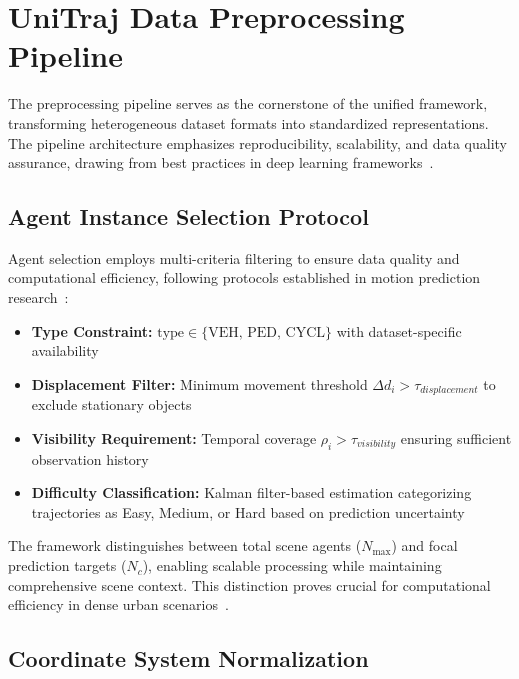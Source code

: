 \section{UniTraj Data Preprocessing Pipeline}
\label{sec:data_pipeline}

The preprocessing pipeline serves as the cornerstone of the unified framework, transforming heterogeneous dataset formats into standardized representations. The pipeline architecture emphasizes reproducibility, scalability, and data quality assurance, drawing from best practices in deep learning frameworks~\cite{vaswani2023attention}.

\subsection{Agent Instance Selection Protocol}
\label{ssec:agent_selection}

Agent selection employs multi-criteria filtering to ensure data quality and computational efficiency, following protocols established in motion prediction research~\cite{WOMD2021, Chai2019MultiPath}:

\begin{itemize}
    \item \textbf{Type Constraint:} $\text{type} \in \{\text{VEH, PED, CYCL}\}$ with dataset-specific availability
    \item \textbf{Displacement Filter:} Minimum movement threshold $\Delta d_{i} > \tau_{displacement}$ to exclude stationary objects
    \item \textbf{Visibility Requirement:} Temporal coverage $\rho_{i} > \tau_{visibility}$ ensuring sufficient observation history
    \item \textbf{Difficulty Classification:} Kalman filter-based estimation categorizing trajectories as Easy, Medium, or Hard based on prediction uncertainty~\cite{MultiPathPlusPlus2022}
\end{itemize}

The framework distinguishes between total scene agents ($N_{\max}$) and focal prediction targets ($N_{c}$), enabling scalable processing while maintaining comprehensive scene context. This distinction proves crucial for computational efficiency in dense urban scenarios~\cite{hu2023planning}.

\subsection{Coordinate System Normalization}
\label{ssec:coordinate_normalization}

